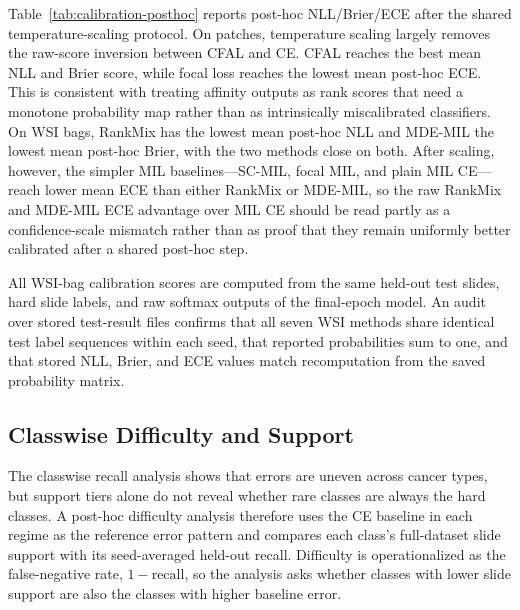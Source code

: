 \documentclass[11pt]{article}
\begin{document}
Table~\ref{tab:calibration-posthoc} reports post-hoc NLL/Brier/ECE after the shared temperature-scaling protocol. On patches, temperature scaling largely removes the raw-score inversion between CFAL and CE. CFAL reaches the best mean NLL and Brier score, while focal loss reaches the lowest mean post-hoc ECE. This is consistent with treating affinity outputs as rank scores that need a monotone probability map rather than as intrinsically miscalibrated classifiers. On WSI bags, RankMix has the lowest mean post-hoc NLL and MDE-MIL the lowest mean post-hoc Brier, with the two methods close on both. After scaling, however, the simpler MIL baselines---SC-MIL, focal MIL, and plain MIL CE---reach lower mean ECE than either RankMix or MDE-MIL, so the raw RankMix and MDE-MIL ECE advantage over MIL CE should be read partly as a confidence-scale mismatch rather than as proof that they remain uniformly better calibrated after a shared post-hoc step.

All WSI-bag calibration scores are computed from the same held-out test slides, hard slide labels, and raw softmax outputs of the final-epoch model. An audit over stored test-result files confirms that all seven WSI methods share identical test label sequences within each seed, that reported probabilities sum to one, and that stored NLL, Brier, and ECE values match recomputation from the saved probability matrix.

\subsection{Classwise Difficulty and Support}
The classwise recall analysis shows that errors are uneven across cancer types, but support tiers alone do not reveal whether rare classes are always the hard classes. A post-hoc difficulty analysis therefore uses the CE baseline in each regime as the reference error pattern and compares each class's full-dataset slide support with its seed-averaged held-out recall. Difficulty is operationalized as the false-negative rate, $1-\mathrm{recall}$, so the analysis asks whether classes with lower slide support are also the classes with higher baseline error.

\begin{table}[htbp]
  \centering
  \small
  
  \caption{Hardest classes under each regime's CE baseline, averaged over seeds 0--2 on the held-out test split. Support rank is computed from full TCGA-UT slide counts, with rank 1 indicating the lowest-support class. Difficulty rank orders classes by baseline error rate, $1-\mathrm{recall}$.}
  \label{tab:classwise-difficulty}
\end{table}
\end{document}
